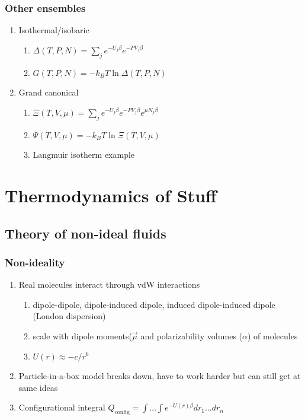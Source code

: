 \documentclass[11pt]{article}
\begin{document}
\subsubsection{Other ensembles}
\label{sec:orga13260d}
\begin{enumerate}
\item Isothermal/isobaric
\begin{enumerate}
\item \(\Delta(T,P,N) = \sum_j e^{-U_j\beta} e^{-PV_j\beta}\)
\item \(G(T,P,N) = -k_B T \ln \Delta(T,P,N)\)
\end{enumerate}
\item Grand canonical
\begin{enumerate}
\item \(\Xi(T,V,\mu) = \sum_j e^{-U_j\beta} e^{-PV_j\beta}e^{\mu N_j \beta}\)
\item \(\Psi(T,V,\mu) = - k_B T \ln \Xi(T,V,\mu)\)
\item Langmuir isotherm example
\end{enumerate}
\end{enumerate}
\section{Thermodynamics of Stuff}
\label{sec:org7d4b6c1}
\subsection{Theory of non-ideal fluids}
\label{sec:org4097598}
\subsubsection{Non-ideality}
\label{sec:orgc8a0c9b}
\begin{enumerate}
\item Real molecules interact through vdW interactions
\begin{enumerate}
\item dipole-dipole, dipole-induced dipole, induced dipole-induced dipole
(London dispersion)
\item scale with dipole moments(\(\vec{\mu}\) and polarizability volumes
(\(\alpha\)) of molecules
\item \(U(r) \approx - c/r^6\)
\end{enumerate}
\item Particle-in-a-box model breaks down, have to work harder but
can still get at same ideas
\item Configurational integral \(Q_\mathrm{config}=\int \ldots \int e^{-U(r)\beta} dr_1\ldots dr_n\)
\end{enumerate}
\end{document}
